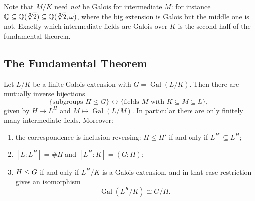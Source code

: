 \documentclass[a4paper]{scrartcl}
\newcommand{\Gal}{\operatorname{Gal}}
\begin{document}
Note that $M/K$ need \emph{not} be Galois for intermediate $M$: for instance $\mathbb{Q} \subseteq \mathbb{Q}(\sqrt[3]2) \subseteq \mathbb{Q}(\sqrt[3]2,\omega)$, where the big extension is Galois but the middle one is not. Exactly which intermediate fields are Galois over $K$ is the second half of the fundamental theorem.

\subsection{The Fundamental Theorem}

\begin{theorem}\label{thm:ftgt}
	Let $L/K$ be a finite Galois extension with $G = \Gal(L/K)$. Then there are mutually inverse bijections
	$$\{\text{subgroups } H \leq G\} \longleftrightarrow \{\text{fields } M \text{ with } K \subseteq M \subseteq L\},$$
	given by $H \mapsto L^H$ and $M \mapsto \Gal(L/M)$. In particular there are only finitely many intermediate fields. Moreover:
	\begin{enumerate}[label=(\roman*)]
		\item the correspondence is inclusion-reversing: $H \leq H'$ if and only if $L^{H'} \subseteq L^{H}$;
		\item $[L : L^H] = \#H$ and $[L^H : K] = (G : H)$;
		\item $H \trianglelefteq G$ if and only if $L^H/K$ is a Galois extension, and in that case restriction gives an isomorphism
		$$\Gal(L^H/K) \cong G/H.$$
	\end{enumerate}
\end{theorem}
\end{document}
